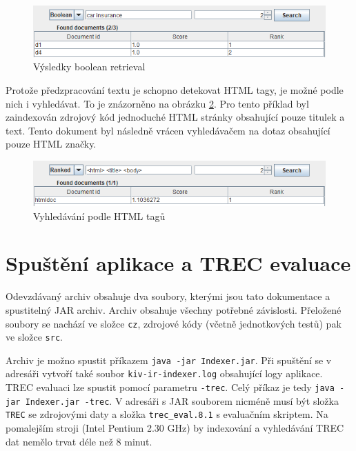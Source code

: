 \documentclass[11pt,a4paper]{scrartcl}
\begin{document}
	\begin{figure}[h]
		\centering
		\includegraphics[width=\linewidth]{gui-boolean-res}
		\caption{Výsledky boolean retrieval}
		\label{fig:boolean}
	\end{figure}
	
	Protože předzpracování textu je schopno detekovat HTML tagy, je možné podle nich i vyhledávat. To je znázorněno na obrázku \ref{fig:html-search}. Pro tento příklad byl zaindexován zdrojový kód jednoduché HTML stránky obsahující pouze titulek a text. Tento dokument byl následně vrácen vyhledávačem na dotaz obsahující pouze HTML značky.
	
	\begin{figure}[h]
		\centering
		\includegraphics[width=\linewidth]{gui-html-search}
		\caption{Vyhledávání podle HTML tagů}
		\label{fig:html-search}
	\end{figure}
	
	\section{Spuštění aplikace a TREC evaluace}
	
	Odevzdávaný archiv obsahuje dva soubory, kterými jsou tato dokumentace a spustitelný JAR archiv. Archiv obsahuje všechny potřebné závislosti. Přeložené soubory se nachází ve složce \verb|cz|, zdrojové kódy (včetně jednotkových testů) pak ve složce \verb|src|.
	
	Archiv je možno spustit příkazem \verb|java -jar Indexer.jar|. Při spuštění se v adresáři vytvoří také soubor \verb|kiv-ir-indexer.log| obsahující logy aplikace. TREC evaluaci lze spustit pomocí parametru \verb|-trec|. Celý příkaz je tedy \verb|java -jar Indexer.jar -trec|. V adresáři s JAR souborem nicméně musí být složka \verb|TREC| se zdrojovými daty a složka \verb|trec_eval.8.1| s evaluačním skriptem. Na pomalejším stroji (Intel Pentium 2.30 GHz) by indexování a vyhledávání TREC dat nemělo trvat déle než 8 minut.
	
\end{document}
